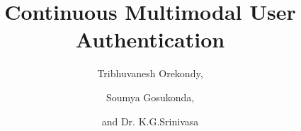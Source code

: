 \documentclass[%
        final,
        notitlepage,
        narroweqnarray,
        inline,
        ]{ieee}
\begin{document}
\title[Continuous Multimodal User Authentication, using soft and hard biometrics]{%
       Continuous Multimodal User Authentication}


\author[]{%
      Tribhuvanesh Orekondy,
    \and
      Soumya Gosukonda,
    \and
      and Dr. K.G.Srinivasa
  }




\maketitle               
\end{document}
